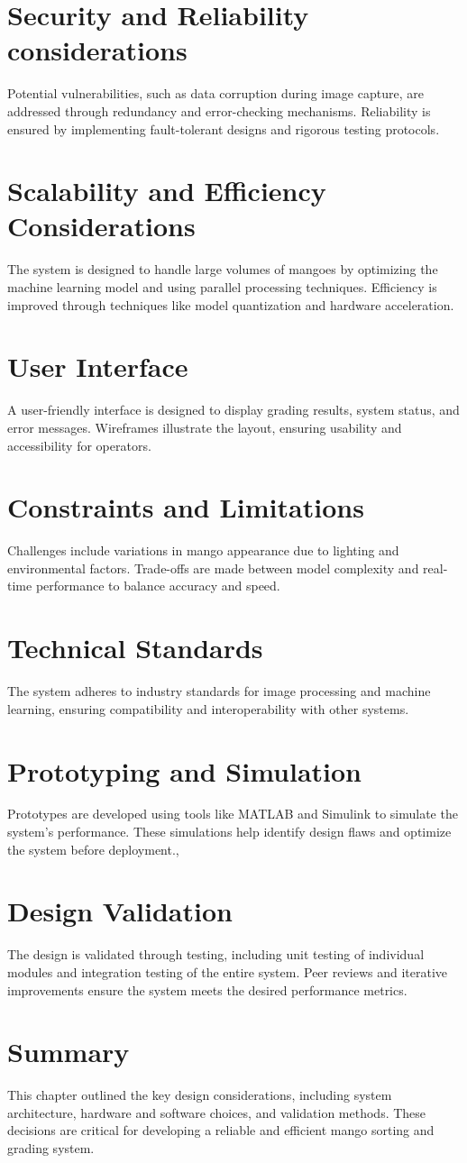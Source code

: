 \section{Security and Reliability considerations}
Potential vulnerabilities, such as data corruption during image capture, are addressed through redundancy and error-checking mechanisms. Reliability is ensured by implementing fault-tolerant designs and rigorous testing protocols.
\section{Scalability and Efficiency Considerations}
The system is designed to handle large volumes of mangoes by optimizing the machine learning model and using parallel processing techniques. Efficiency is improved through techniques like model quantization and hardware acceleration.
\section{User Interface}
A user-friendly interface is designed to display grading results, system status, and error messages. Wireframes illustrate the layout, ensuring usability and accessibility for operators.
\section{Constraints and Limitations}
Challenges include variations in mango appearance due to lighting and environmental factors. Trade-offs are made between model complexity and real-time performance to balance accuracy and speed.
\section{Technical Standards}
The system adheres to industry standards for image processing and machine learning, ensuring compatibility and interoperability with other systems.
\section{Prototyping and Simulation}
Prototypes are developed using tools like MATLAB and Simulink to simulate the system’s performance. These simulations help identify design flaws and optimize the system before deployment.,
\section{Design Validation}
The design is validated through testing, including unit testing of individual modules and integration testing of the entire system. Peer reviews and iterative improvements ensure the system meets the desired performance metrics.
\section{Summary}
This chapter outlined the key design considerations, including system architecture, hardware and software choices, and validation methods. These decisions are critical for developing a reliable and efficient mango sorting and grading system.

